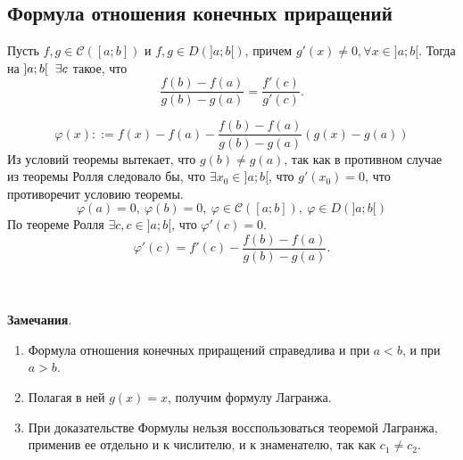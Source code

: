 	\subsection{Формула отношения конечных приращений}
	\begin{theoremk1}
		Пусть $f, g \in \mathcal{C}([a; b])$ и $f, g \in D(]a; b[)$,
		причем $g'(x) \neq 0, \forall x \in ]a; b[$.
		Тогда на $]a; b[  \hspace{0,2 cm} \exists c$ такое, что
		$$\frac{f(b) - f(a)}{g(b) - g(a)} = \frac{f'(c)}{g'(c)}.$$
	\end{theoremk1}
	\begin{Proof}
		$$\varphi(x) ::= f(x) - f(a) - \frac{f(b) - f(a)}{g(b) - g(a)} (g(x) - g(a))$$
		Из условий теоремы вытекает, что $g(b) \neq g(a)$, так как в противном случае из теоремы Ролля следовало бы, что $\exists x_0 \in ]a; b[$, что $g'(x_0) = 0$, что противоречит условию теоремы.
		$$\varphi(a) = 0,\ \varphi(b) = 0,\ \varphi \in \mathcal{C}([a; b]),\ \varphi \in D(]a; b[)$$
		По теореме Ролля $\exists c, c \in ]a; b[$, что $\varphi'(c) = 0$.
		$$\varphi'(c) = f'(c) - \frac{f(b) - f(a)}{g(b) - g(a)}.$$ 
	\end{Proof}\\\\
	\textbf{Замечания}. \begin{enumerate}
		\item Формула отношения конечных приращений справедлива и при $a < b$, и при $a > b$.
		\item  Полагая в ней $g(x) = x$, получим формулу Лагранжа.
		\item При доказательстве Формулы нельзя восспользоваться теоремой Лагранжа, применив ее отдельно и к числителю, и к знаменателю, так как $c_1 \neq c_2$.
	\end{enumerate}

